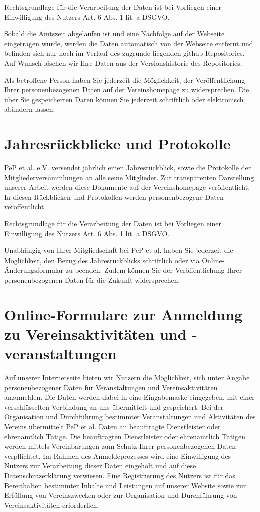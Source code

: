 \documentclass[
  fontsize=12pt,
  paper=a4,
  DIV14,
  parskip,
]{scrartcl}
\begin{document}
Rechtsgrundlage für die Verarbeitung der Daten ist bei Vorliegen einer
Einwilligung des Nutzers Art. 6 Abs. 1 lit. a DSGVO.

Sobald die Amtszeit abgelaufen ist und eine Nachfolge auf der Webseite
eingetragen wurde, werden die Daten automatisch von der Webseite entfernt und
befinden sich nur noch im Verlauf des zugrunde liegenden github Repositories.
Auf Wunsch löschen wir Ihre Daten aus der Versionshistorie des Repositories.

Als betroffene Person haben Sie jederzeit die Möglichkeit, der
Veröffentlichung Ihrer personenbezogenen Daten auf der Vereinshomepage zu
widersprechen. Die über Sie gespeicherten Daten können Sie jederzeit
schriftlich oder elektronisch abändern lassen.

\section{Jahresrückblicke und Protokolle}

PeP et al. e.V. versendet jährlich einen Jahresrückblick, sowie die
Protokolle der Mitgliederversammlungen an alle seine Mitglieder. Zur
transparenten Darstellung unserer Arbeit werden diese Dokumente auf der
Vereinshomepage veröffentlicht.
In diesen Rückblicken und Protokollen werden personenbezogene Daten
veröffentlicht.

Rechtsgrundlage für die Verarbeitung der Daten ist bei Vorliegen einer
Einwilligung des Nutzers Art. 6 Abs. 1 lit. a DSGVO.

Unabhängig von Ihrer Mitgliedschaft bei PeP et al. haben Sie jederzeit die
Möglichkeit, den Bezug des Jahresrückblicks schriftlich oder via
Online-Änderungsformular zu beenden.
Zudem können Sie der Veröffentlichung Ihrer personenbezogenen Daten für die
Zukunft widersprechen.

\section{Online-Formulare zur Anmeldung zu Vereinsaktivitäten und -veranstaltungen}

Auf unserer Internetseite bieten wir Nutzern die Möglichkeit, sich unter
Angabe personenbezogener Daten für Veranstaltungen und Vereinsaktivitäten
anzumelden.
Die Daten werden dabei in eine Eingabemaske eingegeben, mit einer
verschlüsselten Verbindung an uns übermittelt und gespeichert.
Bei der Organisation und Durchführung bestimmter Veranstaltungen und
Aktivitäten des Vereins übermittelt PeP et al. Daten an beauftragte
Dienstleister oder ehrenamtlich Tätige.
Die beauftragten Dienstleister oder ehrenamtlich Tätigen werden mittels
Vereinbarungen zum Schutz Ihrer personenbezogenen Daten verpflichtet.
Im Rahmen des Anmeldeprozesses wird eine Einwilligung des Nutzers zur
Verarbeitung dieser Daten eingeholt und auf diese Datenschutzerklärung
verwiesen.
Eine Registrierung des Nutzers ist für das Bereithalten bestimmter Inhalte
und Leistungen auf unserer Website sowie zur Erfüllung von Vereinszwecken
oder zur Organisation und Durchführung von Vereinsaktivitäten erforderlich.
\end{document}
